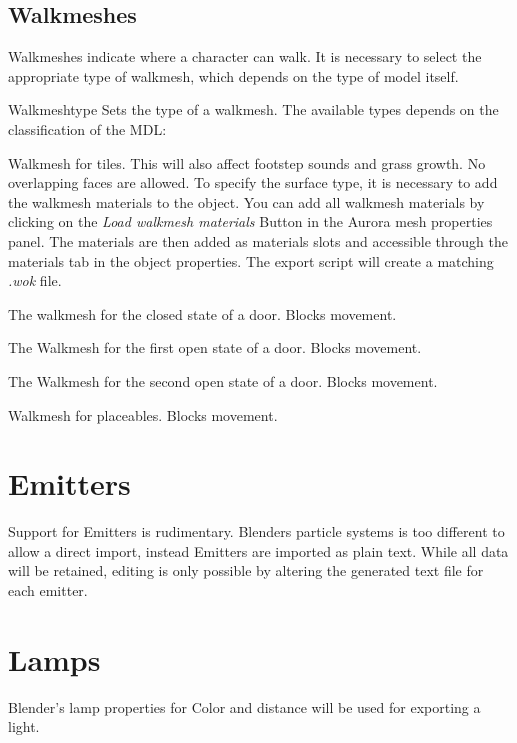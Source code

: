 \subsection{Walkmeshes}
Walkmeshes indicate where a character can walk. It is necessary to select 
the appropriate type of walkmesh, which depends on the type of model itself. 

\begin{propertyAurora}{Walkmeshtype} 
Sets the type of a walkmesh. The available types depends on the classification of the MDL:
\begin{description}[leftmargin=10em,style=nextline]
    \item[Tileset] Walkmesh for tiles. This will also affect footstep sounds and grass growth. No overlapping faces are allowed. To specify the surface type, it is necessary to add the walkmesh materials to the object. You can add all walkmesh materials by clicking on the {\textit{Load walkmesh materials}} Button in the Aurora mesh properties panel. The materials are then added as materials slots and accessible through the materials tab in the object properties.
    The export script will create a matching {\textit{.wok}} file. 
    \item[Door: Closed] The walkmesh for the closed state of a door. Blocks movement.
    \item[Door: Open 1] The Walkmesh for the first open state of a door. Blocks movement.
    \item[Door: Open 2] The Walkmesh for the second open state of a door. Blocks movement.
    \item[Placeable] Walkmesh for placeables. Blocks movement.
\end{description}
\end{propertyAurora}

\section{Emitters}
Support for Emitters is rudimentary. Blenders particle systems is too
different to allow a direct import, instead Emitters are imported as plain
text. While all data will be retained, editing is only possible by altering the 
generated text file for each emitter.

\section{Lamps}
Blender's lamp properties for Color and distance will be used for exporting a light.

